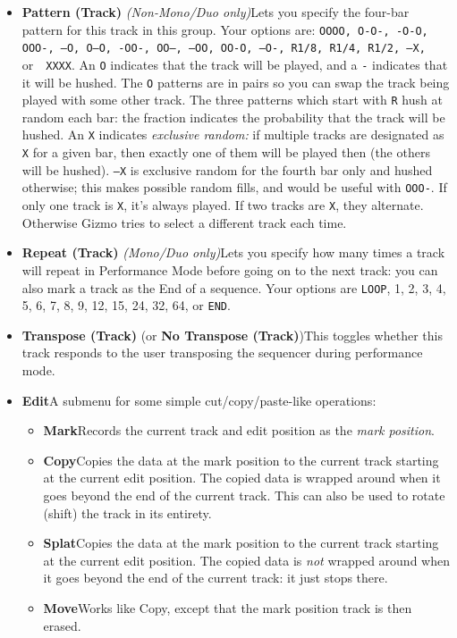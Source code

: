\documentclass{article}
\begin{document}
\begin{itemize}
\item {\bf Pattern (Track)} {\it (Non-Mono/Duo only)}\quad Lets you specify the four-bar pattern for this track in this group.  Your options are: \texttt{OOOO, O-O-, -O-O, OOO-, ---O, O--O, -OO-, OO--, --OO, OO-O, --O-, R1/8, R1/4, R1/2, ---X,} or\ \ {\tt XXXX}.  An {\tt O} indicates that the track will be played, and a {\tt -} indicates that it will be hushed.  The {\tt O} patterns are in pairs so you can swap the track being played with some other track.  The three patterns which start with {\tt R} hush at random each bar: the fraction indicates the probability that the track will be hushed.  An {\tt X} indicates {\it exclusive random:} if multiple tracks are designated as {\tt X} for a given bar, then exactly one of them will be played then (the others will be hushed).   {\tt ---X} is exclusive random for the fourth bar only and hushed otherwise; this makes possible random fills, and would be useful with {\tt OOO-}.   If only one track is {\tt X}, it's always played.  If two tracks are {\tt X}, they alternate.  Otherwise Gizmo tries to select a different track each time.
\item {\bf Repeat (Track)} {\it (Mono/Duo only)}\quad Lets you specify how many times a track will repeat in Performance Mode before going on to the next track: you can also mark a track as the End of a sequence.  Your options are {\tt LOOP}, 1, 2, 3, 4, 5, 6, 7, 8, 9, 12, 15, 24, 32, 64, or {\tt END}.
\item {\bf Transpose (Track)} (or {\bf No Transpose (Track)})\quad This toggles whether this track responds to the user transposing the sequencer during performance mode.
\item {\bf Edit}\quad A submenu for some simple cut/copy/paste-like operations:
\begin{itemize}
\item {\bf Mark}\quad Records the current track and edit position as the {\it mark position}.
\item {\bf Copy}\quad Copies the data at the mark position to the current track starting at the current edit position.  The copied data is wrapped around when it goes beyond the end of the current track.  This can also be used to rotate (shift) the track in its entirety.
\item {\bf Splat}\quad Copies the data at the mark position to the current track starting at the current edit position.  The copied data is {\it not} wrapped around when it goes beyond the end of the current track: it just stops there.
\item {\bf Move}\quad Works like Copy, except that the mark position track is then erased.

\end{itemize}
\end{itemize}
\end{document}
